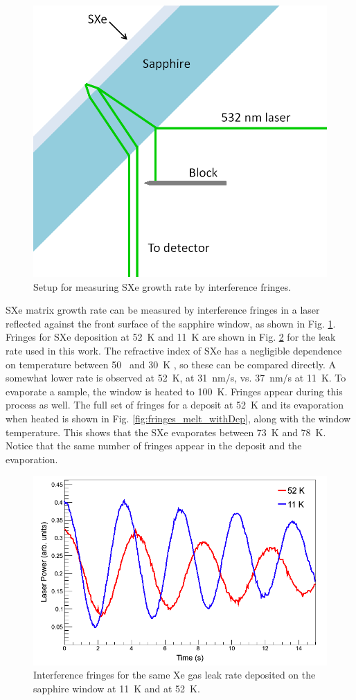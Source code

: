 \begin{figure} %
        \centering
                \includegraphics[width=.4\textwidth]{figures/fringe_setup.png}
                \caption{Setup for measuring SXe growth rate by interference fringes.}
\label{fig:fringe_setup}
\end{figure}

SXe matrix growth rate can be measured by interference fringes in a laser reflected against the front surface of the sapphire window, as shown in Fig. \ref{fig:fringe_setup}.  Fringes for SXe deposition at 52~K and 11~K are shown in Fig. \ref{fig:fringes_52K_vs_11K} for the leak rate used in this work.  The refractive index of SXe has a negligible dependence on temperature between 50~ and 30~K \cite{SXeIndex}, so these can be compared directly.  A somewhat lower rate is observed at 52~K, at 31~nm/s, vs. 37~nm/s at 11~K.  To evaporate a sample, the window is heated to 100~K.  Fringes appear during this process as well.  The full set of fringes for a deposit at 52~K and its evaporation when heated is shown in Fig. \ref{fig:fringes_melt_withDep}, along with the window temperature.  This shows that the SXe evaporates between 73~K and 78~K.  Notice that the same number of fringes appear in the deposit and the evaporation.

\begin{figure} %
        \centering
                \includegraphics[width=.7\textwidth]{figures/fringes_52K_vs_11K.png}
                \caption{Interference fringes for the same Xe gas leak rate deposited on the sapphire window at 11~K and at 52~K.}
\label{fig:fringes_52K_vs_11K}
\end{figure}

